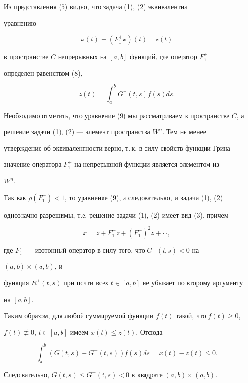  


\begin{pf} Из представления (6) видно, что задача (1), (2) эквивалентна 


уравнению 


\begin{equation} 


x(t)=(F^+_1x)(t)+z(t) 


\end{equation} 


в пространстве $C$ непрерывных на $[a,b]$ функций, где оператор $F^+_1$ 


определен равенством (8), 


$$ 


z(t)=\int^b_a G^-(t,s)f(s)ds. 


$$ 


 


Необходимо отметить, что уравнение (9) мы рассматриваем в пространстве $C$, а 


решение задачи (1), (2) --- элемент пространства $W^n$. Тем не менее 


утверждение об эквивалентности верно, т.\,к. в силу свойств функции Грина 


значение оператора $F^+_1$ на непрерывной функции является элементом из 


$W^n$. 


 


Так как $\rho(F^+_1)<1$, то уравнение (9), а следовательно, и задача (1), (2) 


однозначно разрешимы, т.е. решение задачи (1), (2) имеет вид (3), причем 


$$ 


x=z+F^+_1z+(F^+_1)^2z+\dotsb, 


$$ 


где $F^+_1$ --- изотонный оператор в силу того, что $G^-(t,s)<0$ на 


$(a,b)\times(a,b)$, и 


функция $R^+(t,s)$ при почти всех $t\in[a,b]$ не убывает по второму аргументу 


на $[a,b]$. 


 


Таким образом, для любой суммируемой функции $f(t)$ такой, что $f(t)\ge 0$, 


$f(t)\not\equiv 0$, $t\in[a,b]$ имеем $x(t)\le z(t)$. Отсюда 


$$ 


\int^b_a(G(t,s)-G^-(t,s))f(s)ds = x(t)-z(t) \le 0. 


$$ 


Следовательно, $G(t,s)\le G^-(t,s)<0$ в квадрате $(a,b)\times(a,b)$. 


\end{pf} 


